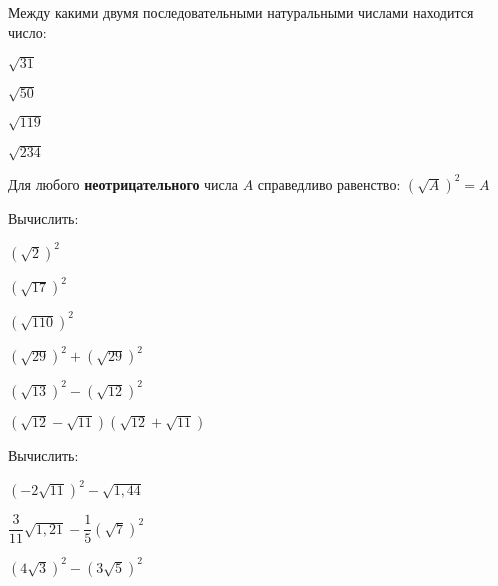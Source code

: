 \begin{class}[number=1]
\begin{listofex}[resume]
		\item Между какими двумя последовательными натуральными числами находится число:
		\begin{enumcols}[itemcolumns=4]
			\item \( \sqrt{31} \)
			\item \( \sqrt{50} \)
			\item \( \sqrt{119} \)
			\item \( \sqrt{234} \)
		\end{enumcols}
	\end{listofex}
	\begin{definit}
		Для любого \textbf{неотрицательного} числа \( A \) справедливо равенство: \( \left( \sqrt{A} \right)^2=A \)
	\end{definit}
	\begin{listofex}[resume]
		\item Вычислить:
		\begin{enumcols}[itemcolumns=3]
			\item \( (\sqrt{2})^2 \)
			\item \( (\sqrt{17})^2 \)
			\item \( (\sqrt{110})^2 \)
			\item \( (\sqrt{29})^2+(\sqrt{29})^2 \)
			\item \( (\sqrt{13})^2-(\sqrt{12})^2 \)
			\item \( (\sqrt{12}-\sqrt{11})(\sqrt{12}+\sqrt{11}) \)
		\end{enumcols}
		\item Вычислить:
		\begin{enumcols}[itemcolumns=3]
			\item \( (-2\sqrt{11})^2-\sqrt{1,44} \)
			\item \( \dfrac{3}{11}\sqrt{1,21}-\dfrac{1}{5}(\sqrt{7})^2 \)
			\item \( (4\sqrt{3})^2-(3\sqrt{5})^2 \)

		\end{enumcols}
	\end{listofex}
\end{class}
